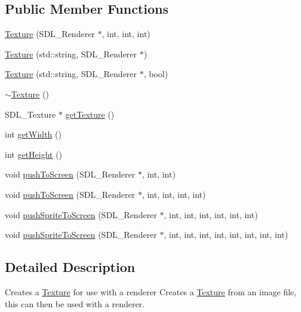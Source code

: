 \subsection*{Public Member Functions}
\begin{DoxyCompactItemize}
\item 
\hyperlink{class_texture_a3e603c08f4b2b4f43822a99a6b865bee}{Texture} (S\+D\+L\+\_\+\+Renderer $\ast$, int, int, int)
\item 
\hyperlink{class_texture_a10abeebb644ea969c78f4fa443ec17c1}{Texture} (std\+::string, S\+D\+L\+\_\+\+Renderer $\ast$)
\item 
\hyperlink{class_texture_a6edf59e3b10e474356e8a7878af56b83}{Texture} (std\+::string, S\+D\+L\+\_\+\+Renderer $\ast$, bool)
\item 
\hyperlink{class_texture_a09c4bcb7462f64c1d20fa69dba3cee8a}{$\sim$\+Texture} ()
\item 
S\+D\+L\+\_\+\+Texture $\ast$ \hyperlink{class_texture_a77a1ae0043a4b318a60df3b02ef2d3f6}{get\+Texture} ()
\item 
int \hyperlink{class_texture_a91a6fd3355bc870194851514194daaab}{get\+Width} ()
\item 
int \hyperlink{class_texture_a80e143905655b173df5994300088ce35}{get\+Height} ()
\item 
void \hyperlink{class_texture_aec498f1f84eb10bb60d3c3117884e70f}{push\+To\+Screen} (S\+D\+L\+\_\+\+Renderer $\ast$, int, int)
\item 
void \hyperlink{class_texture_ab3b1f6aa29a50ef2c012fbc9d0cb8bd8}{push\+To\+Screen} (S\+D\+L\+\_\+\+Renderer $\ast$, int, int, int, int)
\item 
void \hyperlink{class_texture_a703db8963b46b751b8affce1807725b7}{push\+Sprite\+To\+Screen} (S\+D\+L\+\_\+\+Renderer $\ast$, int, int, int, int, int, int)
\item 
void \hyperlink{class_texture_a105a3aba66afb7d223ac086aa465b70d}{push\+Sprite\+To\+Screen} (S\+D\+L\+\_\+\+Renderer $\ast$, int, int, int, int, int, int, int, int)
\end{DoxyCompactItemize}


\subsection{Detailed Description}
Creates a \hyperlink{class_texture}{Texture} for use with a renderer Creates a \hyperlink{class_texture}{Texture} from an image file, this can then be used with a renderer. 

